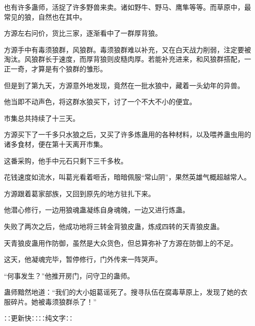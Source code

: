 \begin{this_body}
也有许多蛊师，活捉了许多野兽来卖。诸如野牛、野马、鹰隼等等。而草原中，最常见的狼，自然也在其中。

方源左右问价，货比三家，逐渐看中了一群厚背狼。

方源手中有毒须狼群，风狼群。毒须狼群难以补充，又在白天战力削弱，注定要被淘汰。风狼群长于速度，而厚背狼则皮糙肉厚。若能补充进来，和风狼群搭配，一正一奇，才算是有个狼群的雏形。

但是到了第九天，方源意外地发现，竟然在一批水狼中，藏着一头幼年的异兽。

他当即不动声色，将这群水狼买下，讨了一个不大不小的便宜。

市集总共持续了十三天。

方源买下了一千多只水狼之后，又买了许多炼蛊用的各种材料，以及喂养蛊虫用的诸多食材，便在第十天离开市集。

这番采购，他手中元石只剩下三千多枚。

花钱速度如流水，叫葛光看着咂舌，暗暗佩服“常山阴”，果然英雄气概超越常人。

方源跟着葛家部族，又回到原先的地方驻扎下来。

他潜心修行，一边用狼魂蛊凝练自身魂魄，一边又进行炼蛊。

失败了两次之后，他成功地将三转金背狼皮蛊，炼成四转的天青狼皮蛊。

天青狼皮蛊用作防御，虽然是大众货色，但总算弥补了方源在防御上的不足。

这天，他凝魂完毕，暂停修行，门外传来一阵哭声。

“何事发生？”他推开房门，问守卫的蛊师。

蛊师黯然地道：“我们的大小姐葛谣死了。搜寻队伍在腐毒草原上，发现了她的衣服碎片。她被毒须狼群杀了！”

∷更新快∷∷纯文字∷

\end{this_body}

